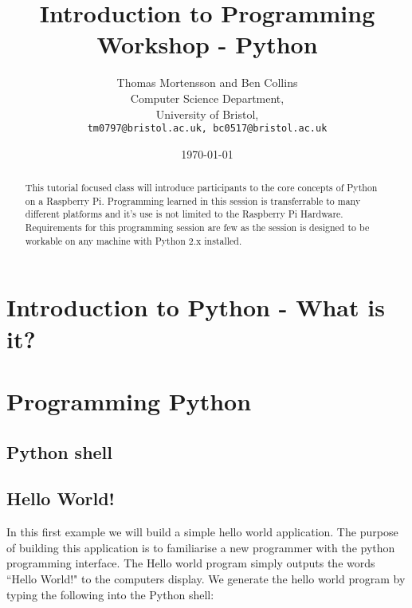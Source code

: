 \documentclass[twocolumn]{article}
\begin{document}
\lstset{language=Python,showstringspaces=false}

\title{Introduction to Programming Workshop - Python} 
\author{Thomas Mortensson and Ben Collins\\
        	Computer Science Department,\\
		University of Bristol,\\
		\texttt{tm0797@bristol.ac.uk, 
		bc0517@bristol.ac.uk}}  %
\date{\today}  %
\maketitle

\begin{abstract}
This tutorial focused class will introduce participants to the core concepts of Python on a Raspberry Pi. Programming learned in this session is transferrable to many different platforms and it's use is not limited to the Raspberry Pi Hardware.\\

 Requirements for this programming session are  few as the session is designed to be workable on any machine with Python 2.x installed.
\end{abstract}

\section{Introduction to Python - What is it?}

\section {Programming Python}



\subsection{Python shell}

\subsection{Hello World!}

In this first example we will build a simple hello world application. The purpose of building this application is to familiarise a new programmer with the python programming interface. The Hello world program simply outputs the words ``Hello World!" to the computers display. We generate the hello world program by typing the following into the Python shell: 
\end{document}
